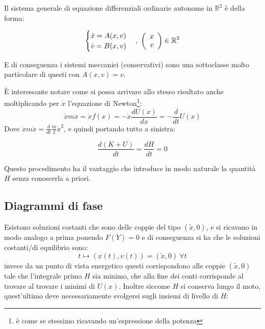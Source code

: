 \documentclass[Main.tex]{subfiles}
\begin{document}
\newpage
\begin{osservazioni}

	\item Il sistema generale di equazione differenziali ordinarie autonome in $\mathbb{R}^2$ è della forma:

\begin{equation}
	\begin{cases}
	\dot x = A(x,v)\\
	\dot v = B(x,v)
\end{cases}, \ \left(\begin{array}{c}
x \\
v
\end{array} \right)  \in \mathbb{R}^2
\end{equation}

E di conseguenza i sistemi meccanici (conservativi) sono una sottoclasse molto particolare di questi con $A(x,v)=v$.

	\item È interessante notare come si possa arrivare allo stesso risultato anche moltiplicando per $\dot x$ l'equazione di Newton\footnote{è come se stessimo ricavando un'espressione della potenza}:
\begin{equation}
	\dot x m \ddot x = \dot x f(x) =-\dot x \frac{dU(x)}{dx}= - \frac{d}{dt}U(x)
\end{equation}
Dove $\dot x m \ddot x = \frac{d}{dt}\frac{m}{2} \dot x^2$, e quindi portando tutto a sinistra:

\begin{equation}
  \frac{d (K+U)}{dt}=\frac{d H}{dt}=0
\end{equation}

Questo procedimento ha il vantaggio che introduce in modo naturale la quantità $H$ senza conoscerla a priori.
\end{osservazioni}

\newpage
\subsection{Diagrammi di fase}
Esistono soluzioni costanti che sono delle coppie del tipo $(\tilde x,0)$, e si ricavano in modo analogo a prima ponendo $F(Y)=0$ e di conseguenza si ha che le soluzioni costanti/di equilibrio sono:
\begin{equation}
  t \mapsto (x(t),v(t))=(\tilde x,0) \ \forall t
\end{equation}
invece da un punto di vista energetico questi corrispondono alle coppie $(\tilde x, 0)$ tale che l'integrale primo $H$ sia minimo, che alla fine dei conti corrisponde al trovare al trovare i minimi di $U(x)$. Inoltre siccome $H$ si conserva lungo il moto, quest'ultimo deve necessariamente svolgersi sugli insiemi di livello di $H$:
\end{document}
